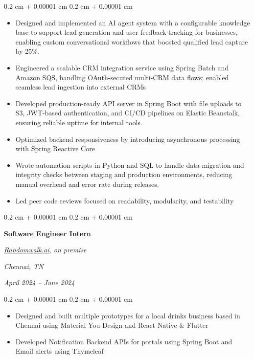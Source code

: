 \documentclass[10pt, letterpaper]{article}
\newenvironment{highlights}{
    \begin{itemize}[
        topsep=0.10 cm,
        parsep=0.10 cm,
        partopsep=0pt,
        itemsep=0pt,
        leftmargin=0.4 cm + 10pt
    ]
}{
    \end{itemize}
} %
\newenvironment{onecolentry}{
    \begin{adjustwidth}{
        0.2 cm + 0.00001 cm
    }{
        0.2 cm + 0.00001 cm
    }
}{
    \end{adjustwidth}
} %
\newenvironment{twocolentry}[2][]{
    \onecolentry
    \def\secondColumn{#2}
    \setcolumnwidth{\fill, 4.5 cm}
    \begin{paracol}{2}
}{
    \switchcolumn\raggedleft\secondColumn
    \end{paracol}
    \endonecolentry
} %
\let\hrefWithoutArrow\href
\renewcommand{\href}[2]{\hrefWithoutArrow{#1}{\ifthenelse{\equal{#2}{}}{ }{#2 }\raisebox{.15ex}{\footnotesize \faExternalLink*}}}
\begin{document}
\vspace{0.10 cm}
\begin{onecolentry}
    \begin{highlights}
    \item Designed and implemented an AI agent system with a configurable knowledge base to support lead generation and user feedback tracking for businesses, enabling custom conversational workflows that boosted qualified lead capture by 25\%.
    \item Engineered a scalable CRM integration service using Spring Batch and Amazon SQS, handling OAuth-secured multi-CRM data flows; enabled seamless lead ingestion into external CRMs
    \item Developed production-ready API server in Spring Boot with file uploads to S3, JWT-based authentication, and CI/CD pipelines on Elastic Beanstalk, ensuring reliable uptime for internal tools.
    \item Optimized backend responsiveness by introducing asynchronous processing with Spring Reactive Core 
    \item Wrote automation scripts in Python and SQL to handle data migration and integrity checks between staging and production environments, reducing manual overhead and error rate during releases.
    \item Led peer code reviews focused on readability, modularity, and testability
    \end{highlights}
\end{onecolentry}

\vspace{0.2 cm}

\begin{twocolentry}{
        \textit{Chennai, TN}

        \textit{April 2024 – June 2024}}
    \textbf{Software Engineer Intern}

    \textit{{\hrefWithoutArrow{https://randomwalk.ai/}{\color{black}\hspace*{0.13cm}Randomwalk.ai}}, on premise}
\end{twocolentry}

\vspace{0.10 cm}
\begin{onecolentry}
    \begin{highlights}
        \item Designed and built multiple prototypes for a local drinks business
        based in Chennai using Material You Design and React Native \& Flutter
        \item Developed Notification Backend APIs for
        \textit{\href{https://chateleon.com}{Chateleon}} portals using Spring Boot and
        Email alerts using Thymeleaf
    \end{highlights}
\end{onecolentry}
\end{document}
